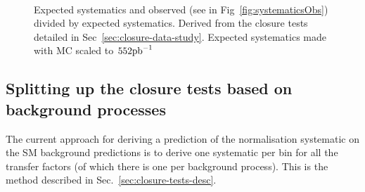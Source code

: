 \begin{figure}[]
  \centering
   ~~
  \caption{\label{fig:systematicsExp} Expected systematics and observed
  (see in Fig~\ref{fig:systematicsObs})
  divided by expected systematics. Derived from the closure tests 
  detailed in Sec~\ref{sec:closure-data-study}. Expected systematics made with MC
  scaled to $552\ipb$}
\end{figure}


\subsection{Splitting up the closure tests based on background
processes \label{sec:closure-split}}

The current approach for deriving a prediction of the normalisation systematic
on the SM background predictions is to derive one systematic per bin
for all the transfer factors (of which there is one per background process). This is the 
method described in Sec.~\ref{sec:closure-tests-desc}.

